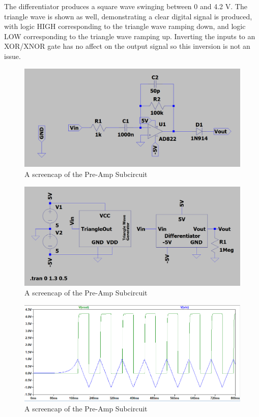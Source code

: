 The differentiator produces a square wave swinging between 0 and 4.2 V.
The triangle wave is shown as well, demonstrating a clear digital signal is produced, with logic HIGH corresponding to the triangle wave ramping down, and logic LOW corresponding to the triangle wave ramping up. 
Inverting the inputs to an XOR/XNOR gate has no affect on the output signal so this inversion is not an issue. 

\begin{figure}[H]
    \centering 
    \includegraphics[width=\textwidth]{../Circuits/Images/Differentiator/Schematic}
    \caption{A screencap of the Pre-Amp Subcircuit}
    \label{fig:differentiatorSchematic}
\end{figure}

\begin{figure}[H]
    \centering 
    \includegraphics[width=\textwidth]{../Circuits/Images/Differentiator/TestBench}
    \caption{A screencap of the Pre-Amp Subcircuit}
    \label{fig:differentiatorTestBench}
\end{figure}

\begin{figure}[H]
    \centering 
    \includegraphics[width=\textwidth]{../Circuits/Images/Differentiator/TestBenchWaveform}
    \caption{A screencap of the Pre-Amp Subcircuit}
    \label{fig:differentiatorTestBenchWaveform}
\end{figure}

